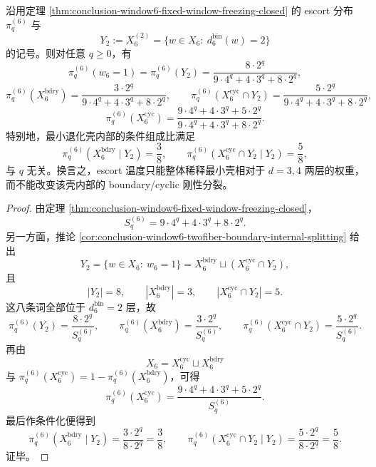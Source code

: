 \begin{proposition}\label{prop:conclusion-window6-minshell-escort-sector-law}
沿用定理 \ref{thm:conclusion-window6-fixed-window-freezing-closed} 的 escort 分布 \(\pi_q^{(6)}\) 与
\[
Y_2:=X_6^{(2)}=\{w\in X_6:\ d_6^{\mathrm{bin}}(w)=2\}
\]
的记号。则对任意 \(q\ge 0\)，有
\[
\pi_q^{(6)}(w_6=1)=\pi_q^{(6)}(Y_2)=\frac{8\cdot 2^q}{9\cdot 4^q+4\cdot 3^q+8\cdot 2^q},
\]
\[
\pi_q^{(6)}(X_6^{\mathrm{bdry}})=\frac{3\cdot 2^q}{9\cdot 4^q+4\cdot 3^q+8\cdot 2^q},
\qquad
\pi_q^{(6)}(X_6^{\mathrm{cyc}}\cap Y_2)=\frac{5\cdot 2^q}{9\cdot 4^q+4\cdot 3^q+8\cdot 2^q},
\]
\[
\pi_q^{(6)}(X_6^{\mathrm{cyc}})
=
\frac{9\cdot 4^q+4\cdot 3^q+5\cdot 2^q}{9\cdot 4^q+4\cdot 3^q+8\cdot 2^q}.
\]
特别地，最小退化壳内部的条件组成比满足
\[
\pi_q^{(6)}(X_6^{\mathrm{bdry}}\mid Y_2)=\frac38,
\qquad
\pi_q^{(6)}(X_6^{\mathrm{cyc}}\cap Y_2\mid Y_2)=\frac58,
\]
与 \(q\) 无关。换言之，escort 温度只能整体稀释最小壳相对于 \(d=3,4\) 两层的权重，而不能改变该壳内部的 boundary/cyclic 刚性分裂。
\end{proposition}
\begin{proof}
由定理 \ref{thm:conclusion-window6-fixed-window-freezing-closed}，
\[
S_q^{(6)}=9\cdot 4^q+4\cdot 3^q+8\cdot 2^q.
\]
另一方面，推论 \ref{cor:conclusion-window6-twofiber-boundary-internal-splitting} 给出
\[
Y_2=\{w\in X_6:\ w_6=1\}
=
X_6^{\mathrm{bdry}}\sqcup (X_6^{\mathrm{cyc}}\cap Y_2),
\]
且
\[
|Y_2|=8,\qquad |X_6^{\mathrm{bdry}}|=3,\qquad |X_6^{\mathrm{cyc}}\cap Y_2|=5.
\]
这八条词全部位于 \(d_6^{\mathrm{bin}}=2\) 层，故
\[
\pi_q^{(6)}(Y_2)=\frac{8\cdot 2^q}{S_q^{(6)}},
\qquad
\pi_q^{(6)}(X_6^{\mathrm{bdry}})=\frac{3\cdot 2^q}{S_q^{(6)}},
\qquad
\pi_q^{(6)}(X_6^{\mathrm{cyc}}\cap Y_2)=\frac{5\cdot 2^q}{S_q^{(6)}}.
\]
再由
\[
X_6=X_6^{\mathrm{cyc}}\sqcup X_6^{\mathrm{bdry}}
\]
与 \(\pi_q^{(6)}(X_6^{\mathrm{cyc}})=1-\pi_q^{(6)}(X_6^{\mathrm{bdry}})\)，可得
\[
\pi_q^{(6)}(X_6^{\mathrm{cyc}})
=
\frac{9\cdot 4^q+4\cdot 3^q+5\cdot 2^q}{S_q^{(6)}}.
\]
最后作条件化便得到
\[
\pi_q^{(6)}(X_6^{\mathrm{bdry}}\mid Y_2)
=
\frac{3\cdot 2^q}{8\cdot 2^q}
=
\frac38,
\qquad
\pi_q^{(6)}(X_6^{\mathrm{cyc}}\cap Y_2\mid Y_2)
=
\frac{5\cdot 2^q}{8\cdot 2^q}
=
\frac58.
\]
证毕。
\end{proof}

